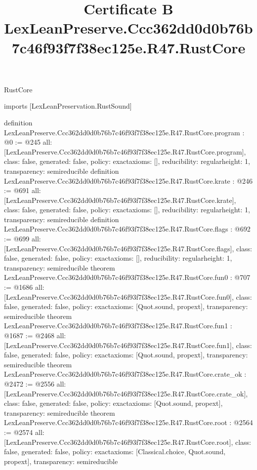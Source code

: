 \begin{lexlean}{RustCore}
\title{Certificate B LexLeanPreserve.Ccc362dd0d0b76b7c46f93f7f38ec125e.R47.RustCore}
\begin{coremodule}
imports [LexLeanPreservation.RustSound]

definition LexLeanPreserve.Ccc362dd0d0b76b7c46f93f7f38ec125e.R47.RustCore.program : @0 := @245 {
  all: [LexLeanPreserve.Ccc362dd0d0b76b7c46f93f7f38ec125e.R47.RustCore.program],
  class: false,
  generated: false,
  policy: exact{axioms: []},
  reducibility: regular{height: 1},
  transparency: semireducible
}
definition LexLeanPreserve.Ccc362dd0d0b76b7c46f93f7f38ec125e.R47.RustCore.krate : @246 := @691 {
  all: [LexLeanPreserve.Ccc362dd0d0b76b7c46f93f7f38ec125e.R47.RustCore.krate],
  class: false,
  generated: false,
  policy: exact{axioms: []},
  reducibility: regular{height: 1},
  transparency: semireducible
}
definition LexLeanPreserve.Ccc362dd0d0b76b7c46f93f7f38ec125e.R47.RustCore.flags : @692 := @699 {
  all: [LexLeanPreserve.Ccc362dd0d0b76b7c46f93f7f38ec125e.R47.RustCore.flags],
  class: false,
  generated: false,
  policy: exact{axioms: []},
  reducibility: regular{height: 1},
  transparency: semireducible
}
theorem LexLeanPreserve.Ccc362dd0d0b76b7c46f93f7f38ec125e.R47.RustCore.fun0 : @707 := @1686 {
  all: [LexLeanPreserve.Ccc362dd0d0b76b7c46f93f7f38ec125e.R47.RustCore.fun0],
  class: false,
  generated: false,
  policy: exact{axioms: [Quot.sound, propext]},
  transparency: semireducible
}
theorem LexLeanPreserve.Ccc362dd0d0b76b7c46f93f7f38ec125e.R47.RustCore.fun1 : @1687 := @2468 {
  all: [LexLeanPreserve.Ccc362dd0d0b76b7c46f93f7f38ec125e.R47.RustCore.fun1],
  class: false,
  generated: false,
  policy: exact{axioms: [Quot.sound, propext]},
  transparency: semireducible
}
theorem LexLeanPreserve.Ccc362dd0d0b76b7c46f93f7f38ec125e.R47.RustCore.crate_ok : @2472 := @2556 {
  all: [LexLeanPreserve.Ccc362dd0d0b76b7c46f93f7f38ec125e.R47.RustCore.crate_ok],
  class: false,
  generated: false,
  policy: exact{axioms: [Quot.sound, propext]},
  transparency: semireducible
}
theorem LexLeanPreserve.Ccc362dd0d0b76b7c46f93f7f38ec125e.R47.RustCore.root : @2564 := @2574 {
  all: [LexLeanPreserve.Ccc362dd0d0b76b7c46f93f7f38ec125e.R47.RustCore.root],
  class: false,
  generated: false,
  policy: exact{axioms: [Classical.choice, Quot.sound, propext]},
  transparency: semireducible
}


\end{coremodule}
\end{lexlean}

